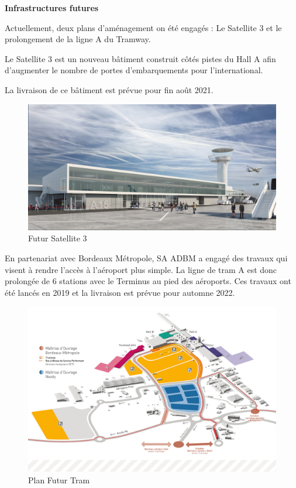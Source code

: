 \newpage

\textbf{Infrastructures futures}\newline

Actuellement, deux plans d'aménagement on été engagés : Le Satellite 3 et le prolongement de la ligne A du Tramway.

Le Satellite 3 est un nouveau bâtiment construit côtés pistes du Hall A afin d'augmenter le nombre de portes d'embarquements pour l'international.

La livraison de ce bâtiment est prévue pour fin août 2021.\newline

\begin{figure}[hbt!]
    \centering
    \includegraphics[width=12cm]{Images/satellite3.jpg}
    \caption{Futur Satellite 3}
    \label{fig:sat3}
\end{figure}

En partenariat avec Bordeaux Métropole, SA ADBM a engagé des travaux qui visent à rendre l'accès à l'aéroport plus simple. La ligne de tram A est donc prolongée de 6 stations avec le Terminus au pied des aéroports. Ces travaux ont été lancés en 2019 et la livraison est prévue pour automne 2022.\newline

\begin{figure}[hbt!]
    \centering
    \includegraphics[width=14cm]{Images/tramway.jpg}
    \caption{Plan Futur Tram}
    \label{fig:futurtram}
\end{figure}

